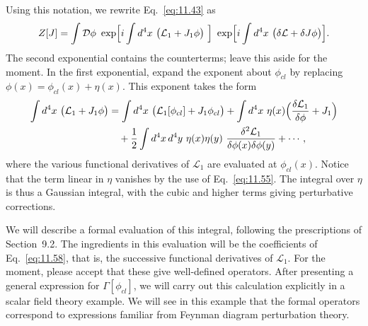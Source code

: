 Using this notation, we rewrite Eq.~\eqref{eq:11.43} as
\begin{equation}
  Z[J] = \int \mathcal{D}\phi\ \exp\Bigl[ i\int d^4x\ \bigl(
    \mathcal{L}_1 + J_1\phi \bigr)\ \Bigr]\ \exp\Bigl[ i\int d^4x\ \bigl(
      \delta\mathcal{L} + \delta J\phi \bigr) \Bigr] .
  \label{eq:11.57}
\end{equation}
The second exponential contains the counterterms; leave this aside for the
moment.  In the first exponential, expand the exponent about $\phi_{cl}$ by
replacing $\phi(x) = \phi_{cl}(x) + \eta(x)$.  This exponent takes the form
\begin{equation}
  \begin{aligned}
    \int d^4x\ \bigl( \mathcal{L}_1 + J_1\phi \bigr)
    &= \int d^4x\ \bigl( \mathcal{L}_1[\phi_{cl}] + J_1\phi_{cl} \bigr)
      + \int d^4x\ \eta(x)\Bigl( \frac{\delta\mathcal{L}_1}{\delta\phi}
        + J_1 \Bigr)\\
    &\quad + \frac{1}{2}\int d^4x\,d^4y\ \eta(x)\eta(y)\
      \frac{\delta^2\mathcal{L}_1}{\delta\phi(x)\delta\phi(y)}
      + \cdots ,
  \end{aligned}
  \label{eq:11.58}
\end{equation}
where the various functional derivatives of $\mathcal{L}_1$ are evaluated at
$\phi_{cl}(x)$.  Notice that the term linear in $\eta$ vanishes by the use of
Eq.~\eqref{eq:11.55}.  The integral over $\eta$ is thus a Gaussian integral,
with the cubic and higher terms giving perturbative corrections.

We will describe a formal evaluation of this integral, following the
prescriptions of Section~9.2.  The ingredients in this evaluation will be the
coefficients of Eq.~\eqref{eq:11.58}, that is, the successive functional
derivatives of $\mathcal{L}_1$.  For the moment, please accept that these give
well-defined operators.  After presenting a general expression for
$\Gamma[\phi_{cl}]$, we will carry out this calculation explicitly in a scalar
field theory example.  We will see in this example that the formal operators
correspond to expressions familiar from Feynman diagram perturbation theory.

